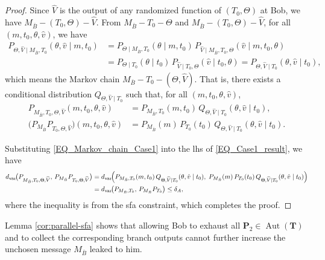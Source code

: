 \documentclass[onecolumn]{IEEEtran} %
\newcommand{\1}{\mathbbm{1}}
\DeclareMathOperator{\Aut}{Aut}
\theoremstyle{boldremark}
\begin{document}
\begin{proof}
Since $\widehat{V}$ is the output of any randomized function of $(T_0,\Theta)$ at Bob, we have
$M_{\bar B}-(T_0,\Theta)-\widehat{V}.$
From $M_{\bar B}-T_0-\Theta$ and $M_{\bar B}-(T_0,\Theta)-\widehat{V}$, for all $(m,t_0,\theta,\hat v)$, we have
\begin{align*}
P_{\Theta,\widehat{V}\mid M_{\bar B},T_0}(\theta,\hat v\mid m,t_0)
&=P_{\Theta\mid M_{\bar B},T_0}(\theta\mid m,t_0)\,
  P_{\widehat{V}\mid M_{\bar B},T_0,\Theta}(\hat v\mid m,t_0,\theta)\\
&=P_{\Theta\mid T_0}(\theta\mid t_0)\,
  P_{\widehat{V}\mid T_0,\Theta}(\hat v\mid t_0,\theta)
= P_{\Theta,\widehat{V}\mid T_0}(\theta,\hat v\mid t_0),
\end{align*}
which means the Markov chain $M_{\bar B}-T_0-(\Theta,\widehat{V})$.
That is, there exists a conditional distribution $Q_{\Theta,\widehat{V}\mid T_0}$ such that, for all
$(m,t_0,\theta,\hat v)$,
\begin{align}
P_{M_{\bar B},T_0,\Theta,\widehat{V}}(m,t_0,\theta,\hat v)
&=P_{M_{\bar B},T_0}(m,t_0)\,Q_{\Theta,\widehat{V}\mid T_0}(\theta,\hat v\mid t_0),\nonumber\\
\bigl(P_{M_{\bar B}}  P_{T_0,\Theta,\widehat{V}}\bigr)(m,t_0,\theta,\hat v)
&=P_{M_{\bar B}}(m)\,P_{T_0}(t_0)\,Q_{\Theta,\widehat{V}\mid T_0}(\theta,\hat v\mid t_0).
\label{EQ_Markov_chain_Case1}
\end{align}

Substituting \eqref{EQ_Markov_chain_Case1} into the \gls{lhs} of \eqref{EQ_Case1_result}, we have
\begin{align*}
d_{\mathrm{var}}\!\bigl(P_{M_{\bar B},T_0,\Theta,\widehat{V}},\,P_{M_{\bar B}}  P_{T_0,\Theta,\widehat{V}}\bigr)
&=
d_{\mathrm{var}}\!\Bigl(P_{M_{\bar B},T_0}(m,t_0)\,Q_{\Theta,\widehat{V}\mid T_0}(\theta,\hat v\mid t_0),\;
P_{M_{\bar B}}(m)\,P_{T_0}(t_0)\,Q_{\Theta,\widehat{V}\mid T_0}(\theta,\hat v\mid t_0)\Bigr)\\
&=
d_{\mathrm{var}}\!\bigl(P_{M_{\bar B},T_0},\,P_{M_{\bar B}}  P_{T_0}\bigr)
\le \delta_A,
\end{align*}
where the inequality is from the \gls{sfa} constraint, which completes the proof.
\end{proof}


Lemma \ref{cor:parallel-sfa} shows that allowing Bob to exhaust all $\mathbf P_2\in\Aut(\mathbf T)$ and to collect the corresponding branch outputs
cannot further increase the unchosen message $M_{\bar B}$ leaked to him.
\end{document}
